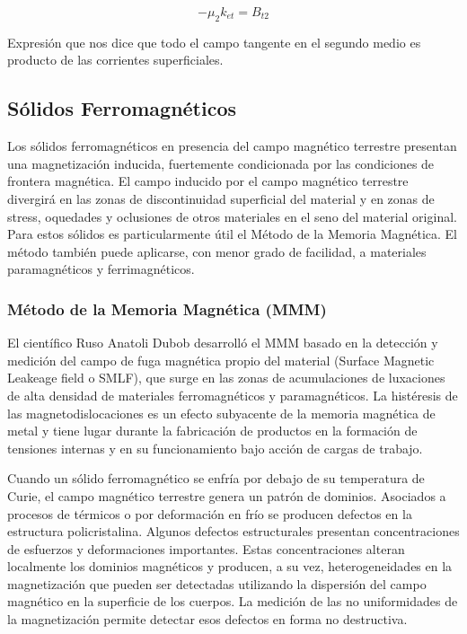 \begin{equation}
	\label{eq:53}
	 - \mu_{2} k_{et} = B_{t2}
\end{equation}

Expresión que nos dice que todo el campo tangente en el segundo medio es producto de las corrientes superficiales.

\subsection{Sólidos Ferromagnéticos}

Los sólidos ferromagnéticos en presencia del campo magnético terrestre presentan una magnetización inducida, fuertemente condicionada por las condiciones de frontera magnética. El campo inducido por el campo magnético terrestre divergirá en las zonas de discontinuidad superficial del material y en zonas de stress, oquedades y oclusiones de otros materiales en el seno del material original. Para estos sólidos es particularmente útil el Método de la Memoria Magnética. El método también puede aplicarse, con menor grado de facilidad, a materiales paramagnéticos y ferrimagnéticos.

\subsubsection{Método de la Memoria Magnética (MMM)}

El científico Ruso Anatoli Dubob desarrolló el MMM basado en la detección y medición del campo de fuga magnética propio del material (Surface Magnetic Leakeage field o SMLF), que surge en las zonas de acumulaciones de luxaciones de alta densidad de materiales ferromagnéticos y paramagnéticos. La histéresis de las magnetodislocaciones es un efecto subyacente de la memoria magnética de metal y tiene lugar durante la fabricación de productos en la formación de tensiones internas y en su funcionamiento bajo acción de cargas de trabajo. 

Cuando un sólido ferromagnético se enfría por debajo de su temperatura de Curie, el campo magnético terrestre genera un patrón de dominios. Asociados a procesos de térmicos o por deformación en frío se producen defectos en la estructura policristalina. Algunos defectos estructurales presentan concentraciones de esfuerzos y deformaciones importantes. Estas concentraciones alteran localmente los dominios magnéticos y producen, a su vez, heterogeneidades en la magnetización que pueden ser detectadas utilizando la dispersión del campo magnético en la superficie de los cuerpos. La medición de las no uniformidades de la magnetización permite detectar esos defectos en forma no destructiva. 

